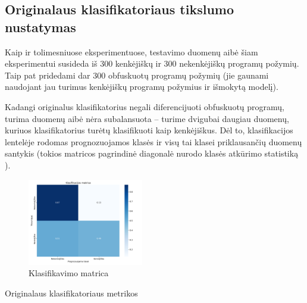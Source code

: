 \subsection{Originalaus klasifikatoriaus tikslumo nustatymas}%

Kaip ir tolimesniuose eksperimentuose, testavimo duomenų aibė šiam
eksperimentui susideda iš 300 kenkėjiškų ir 300 nekenkėjiškų programų požymių.
Taip pat pridedami dar 300 obfuskuotų programų požymių (jie gaunami naudojant
jau turimus kenkėjiškų programų požymius ir išmokytą \MALGAN modelį).

Kadangi originalus klasifikatorius negali diferencijuoti obfuskuotų programų,
turima duomenų aibė nėra subalansuota -- turime dvigubai daugiau duomenų,
kuriuos klasifikatorius turėtų klasifikuoti kaip kenkėjiškus. Dėl to,
klasifikacijos lentelėje  rodomas prognozuojamos klasės
ir visų tai klasei priklausančių duomenų santykis (tokios matricos pagrindinė
diagonalė nurodo klasės atkūrimo statistiką ).

\begin{figure}[h]
    \centering
    \includegraphics[width=0.45\textwidth]{images/normal_2x2.png}
    \caption{Klasifikavimo matrica}
    \label{fig:exp1:confusion}
\end{figure}

\begin{table}[h]
    \caption{Originalaus klasifikatoriaus metrikos}
    \centering
    \label{tbl:exp1:metrics}
\end{table}